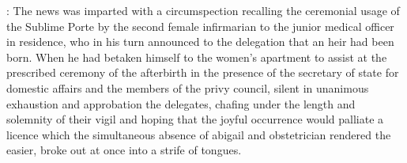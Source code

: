 \documentclass[12pt]{article}
\begin{document}


: The news was imparted with a circumspection recalling the ceremonial
usage of the Sublime Porte by the second female infirmarian to the junior
medical officer in residence, who in his turn announced to the delegation
that an heir had been born. When he had betaken himself to the women's
apartment to assist at the prescribed ceremony of the afterbirth in the
presence of the secretary of state for domestic affairs and the members
of the privy council, silent in unanimous exhaustion and approbation the
delegates, chafing under the length and solemnity of their vigil and
hoping that the joyful occurrence would palliate a licence which the
simultaneous absence of abigail and obstetrician rendered the easier,
broke out at once into a strife of tongues.
\end{document}
